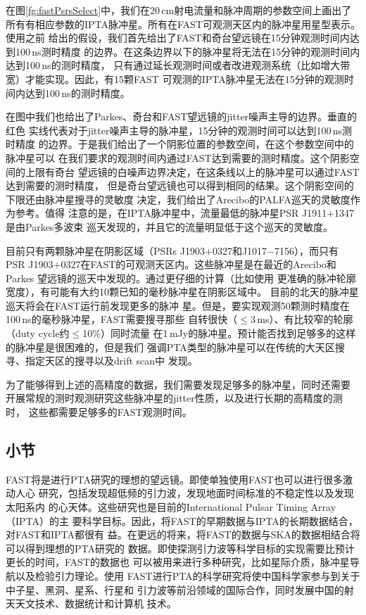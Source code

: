 在图\ref{fg:fastPsrsSelect}中，我们在20\,cm射电流量和脉冲周期的参数空间上画出了
所有有相应参数的IPTA脉冲星。所有在FAST可观测天区内的脉冲星用星型表示。使用之前
给出的假设，我们首先给出了FAST和奇台望远镜在15分钟观测时间内达到100\,ns测时精度
的边界。在这条边界以下的脉冲星将无法在15分钟的观测时间内达到100\,ns的测时精度，
只有通过延长观测时间或者改进观测系统（比如增大带宽）才能实现。因此，有15颗FAST
可观测的IPTA脉冲星无法在15分钟的观测时间内达到100\,ns的测时精度。

在图中我们也给出了Parkes、奇台和FAST望远镜的jitter噪声主导的边界。垂直的红色
实线代表对于jitter噪声主导的脉冲星，15分钟的观测时间可以达到100\,ns测时精度
的边界。于是我们给出了一个阴影位置的参数空间，在这个参数空间中的脉冲星可以
在我们要求的观测时间内通过FAST达到需要的测时精度。这个阴影空间的上限有奇台
望远镜的白噪声边界决定，在这条线以上的脉冲星可以通过FAST达到需要的测时精度，
但是奇台望远镜也可以得到相同的结果。这个阴影空间的下限还由脉冲星搜寻的灵敏度
决定，我们给出了Arecibo的PALFA巡天的灵敏度作为参考\supercite{cfl+06}。值得
注意的是，在IPTA脉冲星中，流量最低的脉冲星PSR J1911$+$1347是由Parkes多波束
巡天发现的\supercite{fsk+04}，并且它的流量明显低于这个巡天的灵敏度。

目前只有两颗脉冲星在阴影区域（PSRs J1903$+$0327和J1017$-$7156），而只有
PSR J1903$+$0327在FAST的可观测天区内。这些脉冲星是在最近的Arecibo和Parkes
望远镜的巡天中发现的\supercite{crl+08,Keith12}。通过更仔细的计算（比如使用
更准确的脉冲轮廓宽度），有可能有大约10颗已知的毫秒脉冲星在阴影区域中。
目前的北天的脉冲星巡天\supercite{blr+13,ng13}将会在FAST运行前发现更多的脉冲
星。但是，要实现观测50颗测时精度在100\,ns的毫秒脉冲星，FAST需要搜寻那些
自转很快（$\le$3\,ms）、有比较窄的轮廓（duty cycle约$\le$10\%）同时流量
在1\,mJy的脉冲星。预计能否找到足够多的这样的脉冲星是很困难的，但是我们
强调PTA类型的脉冲星可以在传统的大天区搜寻、指定天区的搜寻以及drift scan中
发现。

为了能够得到上述的高精度的数据，我们需要发现足够多的脉冲星，同时还需要
开展常规的测时观测研究这些脉冲星的jitter性质，以及进行长期的高精度的测时，
这些都需要足够多的FAST观测时间。

\subsection{小节}

FAST将是进行PTA研究的理想的望远镜。即使单独使用FAST也可以进行很多激动人心
研究，包括发现超低频的引力波，发现地面时间标准的不稳定性以及发现太阳系内
的心天体。这些研究也是目前的International Pulsar Timing Array （IPTA）的主
要科学目标。因此，将FAST的早期数据与IPTA的长期数据结合，对FAST和IPTA都很有
益。在更远的将来，将FAST的数据与SKA的数据相结合将可以得到理想的PTA研究的
数据。即使探测引力波等科学目标的实现需要比预计更长的时间，FAST的数据也
可以被用来进行多种研究，比如星际介质，脉冲星导航以及检验引力理论。使用
FAST进行PTA的科学研究将使中国科学家参与到关于中子星、黑洞、星系、行星和
引力波等前沿领域的国际合作，同时发展中国的射天天文技术、数据统计和计算机
技术。


\pkuthssffaq

